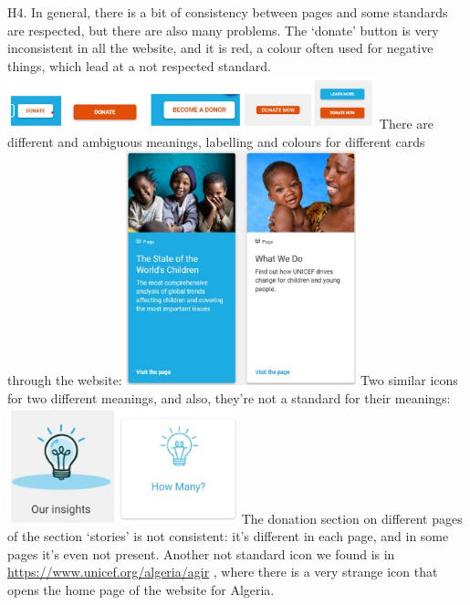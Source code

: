 \newline
\newline H4.	In general, there is a bit of consistency between pages and some standards are respected, but there are also many problems.
\newline The ‘donate’ button is very inconsistent in all the website, and it is red, a colour often used for negative things, which lead at a not respected standard.
\newline \includegraphics[width=0.8\textwidth]{FinalScores8.jpg}
\newline There are different and ambiguous meanings, labelling and colours for different cards through the website:
\newline \includegraphics[width=0.5\textwidth]{FinalScores9.jpg}
\newline Two similar icons for two different meanings, and also, they’re not a standard for their meanings:
\newline \includegraphics[width=0.5\textwidth]{FinalScores10.jpg}
\newline The donation section on different pages of the section ‘stories’ is not consistent: it’s different in each page, and in some pages it’s even not present.
\newline Another not standard icon we found is in \href{https://www.unicef.org/algeria/agir}{https://www.unicef.org/algeria/agir} , where there is a very strange icon that opens the home page of the website for Algeria.
